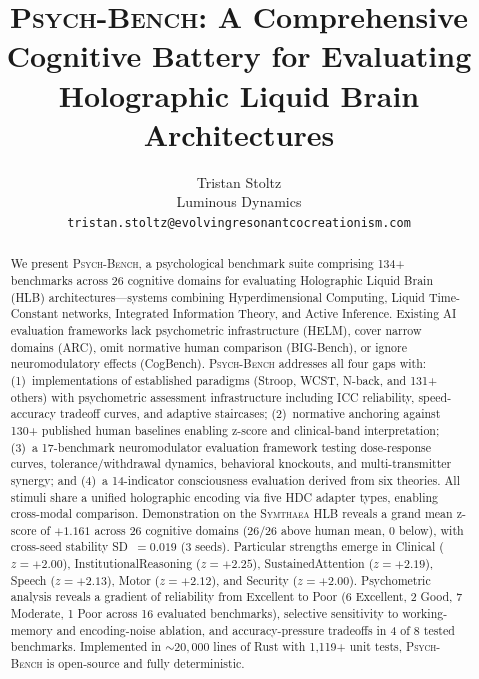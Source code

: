 \documentclass[11pt,letterpaper]{article}
\newcommand{\symthaea}{\textsc{Symthaea}}
\newcommand{\psychbench}{\textsc{Psych-Bench}}
\newcommand{\hlb}{\textsc{HLB}}
\begin{document}
\title{\psychbench{}: A Comprehensive Cognitive Battery for Evaluating\\
Holographic Liquid Brain Architectures}

\author{Tristan Stoltz\\
Luminous Dynamics\\
\texttt{tristan.stoltz@evolvingresonantcocreationism.com}}

\date{}
\maketitle

\begin{abstract}
\noindent
We present \psychbench{}, a psychological benchmark suite comprising 134+ benchmarks across 26 cognitive domains for evaluating Holographic Liquid Brain (\hlb{}) architectures---systems combining Hyperdimensional Computing, Liquid Time-Constant networks, Integrated Information Theory, and Active Inference. Existing AI evaluation frameworks lack psychometric infrastructure (HELM), cover narrow domains (ARC), omit normative human comparison (BIG-Bench), or ignore neuromodulatory effects (CogBench). \psychbench{} addresses all four gaps with: (1)~implementations of established paradigms (Stroop, WCST, N-back, and 131+ others) with psychometric assessment infrastructure including ICC reliability, speed-accuracy tradeoff curves, and adaptive staircases; (2)~normative anchoring against 130+ published human baselines enabling z-score and clinical-band interpretation; (3)~a 17-benchmark neuromodulator evaluation framework testing dose-response curves, tolerance/withdrawal dynamics, behavioral knockouts, and multi-transmitter synergy; and (4)~a 14-indicator consciousness evaluation derived from six theories. All stimuli share a unified holographic encoding via five HDC adapter types, enabling cross-modal comparison. Demonstration on the \symthaea{} \hlb{} reveals a grand mean z-score of $+1.161$ across 26 cognitive domains (26/26 above human mean, 0 below), with cross-seed stability SD~$= 0.019$ (3 seeds). Particular strengths emerge in Clinical ($z = +2.00$), InstitutionalReasoning ($z = +2.25$), SustainedAttention ($z = +2.19$), Speech ($z = +2.13$), Motor ($z = +2.12$), and Security ($z = +2.00$). Psychometric analysis reveals a gradient of reliability from Excellent to Poor (6 Excellent, 2 Good, 7 Moderate, 1 Poor across 16 evaluated benchmarks), selective sensitivity to working-memory and encoding-noise ablation, and accuracy-pressure tradeoffs in 4 of 8 tested benchmarks. Implemented in ${\sim}20{,}000$ lines of Rust with 1,119+ unit tests, \psychbench{} is open-source and fully deterministic.
\end{abstract}
\end{document}
